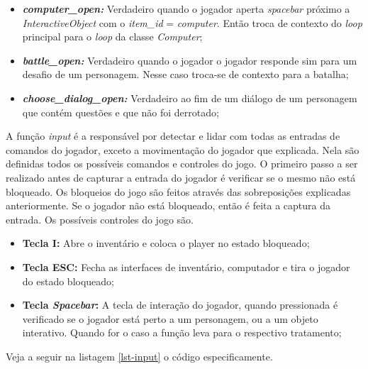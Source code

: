 \begin{enumerate}
\begin{itemize}
        \item \textit{\textbf{computer\_open: }} Verdadeiro quando o jogador aperta \textit{spacebar} próximo a \textit{InteractiveObject} com o \textit{item\_id} = \textit{computer}. Então troca de contexto do \textit{loop} principal para o \textit{loop} da classe \textit{Computer};
        \item \textit{\textbf{battle\_open: }}  Verdadeiro quando o jogador o jogador responde sim para um desafio de um personagem. Nesse caso troca-se de contexto para a batalha;
        \item \textit{\textbf{choose\_dialog\_open: }} Verdadeiro ao fim de um diálogo de um personagem que contém questões e que não foi derrotado;
    \end{itemize}
\end{enumerate}
A função \textit{input} é a responsável por detectar e lidar com todas as entradas de comandos do jogador, exceto a movimentação do jogador que explicada. Nela são definidas todos os possíveis comandos e controles do jogo. O primeiro passo a ser realizado antes de capturar a entrada do jogador é verificar se o mesmo não está bloqueado. Os bloqueios do jogo são feitos através das sobreposições explicadas anteriormente.  
Se o jogador não está bloqueado, então é feita a captura da entrada. Os possíveis controles do jogo são.
\begin{itemize}
    \item \textbf{Tecla I: }Abre o inventário e coloca o player no estado bloqueado;
    \item \textbf{Tecla ESC: }Fecha as interfaces de inventário, computador e tira o jogador do estado bloqueado;
    \item \textbf{Tecla \textit{Spacebar}: }A tecla de interação do jogador, quando pressionada é verificado se o jogador está perto a um personagem, ou a um objeto interativo. Quando for o caso a função leva para o respectivo tratamento;
\end{itemize}

Veja a seguir na listagem \ref{lst-input} o código especificamente.
 
